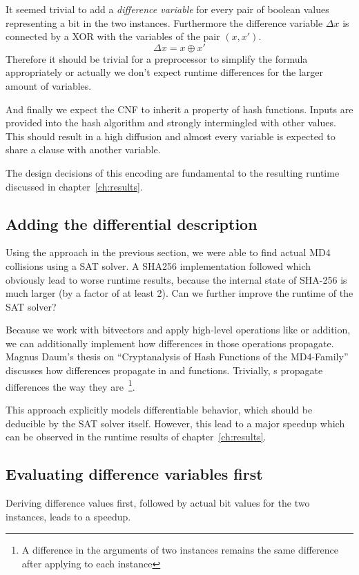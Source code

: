 It seemed trivial to add a \emph{difference variable} for every pair of boolean
values representing a bit in the two instances. Furthermore the difference
variable $\Delta x$ is connected by a XOR with the variables of the pair $(x, x')$.
\[ \Delta x = x \oplus x' \]
Therefore it should be trivial for a preprocessor to simplify the formula
appropriately or actually we don't expect runtime differences for the larger
amount of variables.

And finally we expect the CNF to inherit a property of hash functions.
Inputs are provided into the hash algorithm and strongly intermingled
with other values. This should result in a high diffusion and almost every
variable is expected to share a clause with another variable.

The design decisions of this encoding are fundamental to the
resulting runtime discussed in chapter~\ref{ch:results}.

\subsection{Adding the differential description}
\label{sec:enc-diff-desc}
%
Using the approach in the previous section, we were able to find actual MD4 collisions
using a SAT solver. A SHA256 implementation followed which obviously lead to worse
runtime results, because the internal state of SHA-256 is much larger (by a factor
of at least 2). Can we further improve the runtime of the SAT solver?

Because we work with bitvectors and apply high-level operations like  or addition,
we can additionally implement how differences in those operations propagate.
Magnus Daum's thesis on \enquote{Cryptanalysis of Hash Functions of the
MD4-Family}~\cite[Table 4.4]{daum2005cryptanalysis} discusses how differences propagate in  and
 functions. Trivially, s propagate differences the way they are~\footnote{
A difference in the arguments of two  instances remains the same difference
after applying  to each instance}.

This approach explicitly models differentiable behavior, which should be deducible
by the SAT solver itself. However, this lead to a major speedup which can be observed
in the runtime results of chapter~\ref{ch:results}.

\newpage
\subsection{Evaluating difference variables first}
\label{sec:enc-diff-desc-ocnf}
%
\begin{prop}
  Deriving difference values first, followed by actual bit values for the two instances,
  leads to a speedup.
\end{prop}

